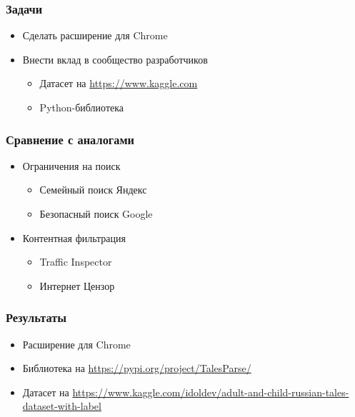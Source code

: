 \documentclass[xetex,mathserif,serif]{beamer}
\begin{document}
	\begin{frame}
		\frametitle{Задачи}
			\begin{itemize}
		 		\item Сделать расширение для Chrome
				\item Внести вклад в сообщество разработчиков
					\begin{itemize}
				    	\item Датасет на \url{https://www.kaggle.com}
				    	\item Python-библиотека
			    	\end{itemize}
			\end{itemize}
	\end{frame}	
	
	\begin{frame}
		\frametitle{Сравнение с аналогами}
			\begin{itemize}
				\item Ограничения на поиск
					\begin{itemize}
				    	\item Семейный поиск Яндекс
				    	\item Безопасный поиск Google
			    	\end{itemize}
			    \item Контентная фильтрация
					\begin{itemize}
				    	\item Traffic Inspector
				    	\item Интернет Цензор
			    	\end{itemize}
			\end{itemize}
	\end{frame}

	\begin{frame}
		\frametitle{Результаты}
		\begin{itemize}
			\item Расширение для Chrome
			\item Библиотека на \url{https://pypi.org/project/TalesParse/}
			\item Датасет на \url{https://www.kaggle.com/idoldev/adult-and-child-russian-tales-dataset-with-label}
		\end{itemize}
	\end{frame}
	
\end{document}

